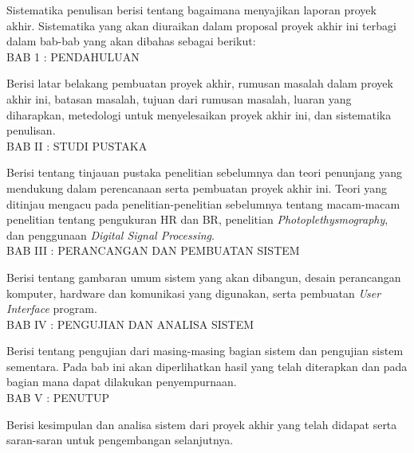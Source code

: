 Sistematika penulisan berisi tentang bagaimana menyajikan laporan proyek akhir. Sistematika yang akan diuraikan dalam proposal proyek akhir ini terbagi dalam bab-bab yang akan dibahas sebagai berikut:
\\
BAB 1 : PENDAHULUAN

Berisi latar belakang pembuatan proyek akhir, rumusan masalah dalam proyek akhir ini, batasan masalah, tujuan dari rumusan masalah, luaran yang diharapkan, metedologi untuk menyelesaikan proyek akhir ini, dan sistematika penulisan.
\\
BAB II : STUDI PUSTAKA

Berisi tentang tinjauan pustaka penelitian sebelumnya dan teori penunjang yang mendukung dalam perencanaan serta pembuatan proyek akhir ini. Teori yang ditinjau mengacu pada penelitian-penelitian sebelumnya tentang macam-macam penelitian tentang pengukuran HR dan BR, penelitian \textit{Photoplethysmography}, dan penggunaan \textit{Digital Signal Processing}.
\\
BAB III : PERANCANGAN DAN PEMBUATAN SISTEM

Berisi tentang gambaran umum sistem yang akan dibangun, desain perancangan komputer, hardware dan komunikasi yang digunakan, serta pembuatan \textit{User Interface} program.
\\
BAB IV : PENGUJIAN DAN ANALISA SISTEM

Berisi tentang pengujian dari masing-masing bagian sistem dan pengujian sistem sementara. Pada bab ini akan diperlihatkan hasil yang telah diterapkan dan pada bagian mana dapat dilakukan penyempurnaan.
\\
BAB V : PENUTUP

Berisi kesimpulan dan analisa sistem dari proyek akhir yang telah didapat serta saran-saran untuk pengembangan selanjutnya.

